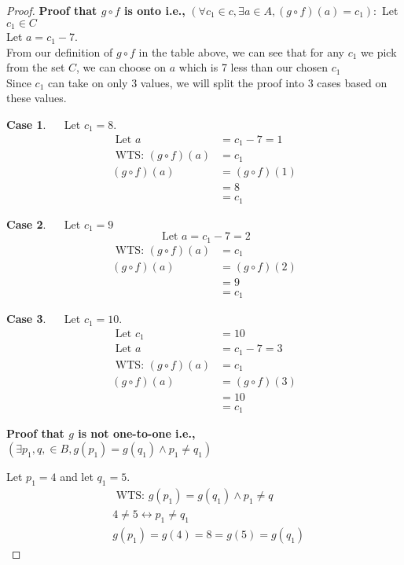 \documentclass[12pt]{article}
\theoremstyle{definition}
\newtheorem{case}{Case}
\begin{document}
\begin{enumerate}
\begin{enumerate}[i]
\begin{proof}
\textbf{Proof that $g \circ f$ is onto i.e.,} $\left(\forall c_{1} \in c, \exists a \in A,(g \circ f)(a)=c_{1}\right):$
Let $c_1 \in C$ \\
Let $a = c_1 - 7$. \\
From our definition of $g \circ f$ in the table above, we can see that for any $c_{1}$ we pick from the set $C$, we can choose on $a$ which is 7 less than our chosen $c_{1}$ \\
Since $c_1$ can take on only 3 values, we will split the proof into 3 cases based on these values. \\
\setcounter{case}{0} 
\begin{case}
$\quad$ Let $c_{1}=8$.
$$
\begin{aligned}
\text { Let } a &=c_{1}-7=1 \\
\text { WTS: }(g \circ f)(a) &=c_{1} \\
(g \circ f)(a) &=(g \circ f)(1) \\
&=8 \\
&=c_{1}
\end{aligned}
$$
\end{case}
\begin{case}
$\quad$ Let $c_{1}=9$
$$
\text { Let } a=c_1-7=2
$$
$$
\begin{aligned}
\text { WTS: } (g \circ f)(a) &=c_{1} \\
(g \circ f)(a) &=(g \circ f)(2) \\
&=9 \\
&=c_{1}
\end{aligned}
$$
\end{case}

\begin{case}
$\quad$ Let $c_{1}=10$.
$$
\begin{aligned}
\text { Let } c_{1} &=10 \\
\text { Let } a &=c_{1}-7=3 \\
\text { WTS: }(g \circ f)(a) &=c_{1} \\
(g \circ f)(a) &=(g \circ f)(3) \\
&=10 \\
&=c_{1} 
\end{aligned}
$$
\end{case}
\textbf{Proof that $g$ is not one-to-one i.e.,} $\left(\exists p_{1}, q, \in B, g\left(p_{1}\right)=g\left(q_{1}\right) \wedge p_{1} \neq q_{1}\right)$ 

Let $p_{1}=4$ and let $q_{1}=5$.
$$
\begin{aligned}
&\text { WTS: } g\left(p_{1}\right)=g\left(q_{1}\right) \wedge p_{1} \neq q \\
&4 \neq 5 \leftrightarrow p_{1} \neq q_{1} \\
&g\left(p_{1}\right)=g(4) =8=g(5)=g\left(q_{1}\right)
\end{aligned}
$$
            \end{proof}
        \end{enumerate}
    \end{enumerate}
\end{document}
